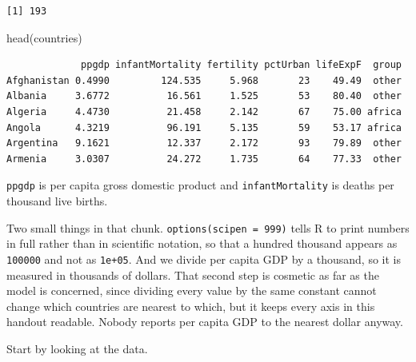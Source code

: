 \documentclass[
  a4paper,
]{scrbook}
\newenvironment{Shaded}{\begin{snugshade}}{\end{snugshade}}
\newcommand{\AttributeTok}[1]{\textcolor[rgb]{0.40,0.45,0.13}{#1}}
\newcommand{\DecValTok}[1]{\textcolor[rgb]{0.68,0.00,0.00}{#1}}
\newcommand{\FloatTok}[1]{\textcolor[rgb]{0.68,0.00,0.00}{#1}}
\newcommand{\FunctionTok}[1]{\textcolor[rgb]{0.28,0.35,0.67}{#1}}
\newcommand{\NormalTok}[1]{\textcolor[rgb]{0.00,0.23,0.31}{#1}}
\newcommand{\SpecialCharTok}[1]{\textcolor[rgb]{0.37,0.37,0.37}{#1}}
\newcommand{\StringTok}[1]{\textcolor[rgb]{0.13,0.47,0.30}{#1}}
\begin{document}
\begin{verbatim}
[1] 193
\end{verbatim}

\begin{Shaded}
\begin{Highlighting}[]
\FunctionTok{head}\NormalTok{(countries)}
\end{Highlighting}
\end{Shaded}

\begin{verbatim}
             ppgdp infantMortality fertility pctUrban lifeExpF  group
Afghanistan 0.4990         124.535     5.968       23    49.49  other
Albania     3.6772          16.561     1.525       53    80.40  other
Algeria     4.4730          21.458     2.142       67    75.00 africa
Angola      4.3219          96.191     5.135       59    53.17 africa
Argentina   9.1621          12.337     2.172       93    79.89  other
Armenia     3.0307          24.272     1.735       64    77.33  other
\end{verbatim}

\texttt{ppgdp} is per capita gross domestic product and
\texttt{infantMortality} is deaths per thousand live births.

Two small things in that chunk. \texttt{options(scipen\ =\ 999)} tells R
to print numbers in full rather than in scientific notation, so that a
hundred thousand appears as \texttt{100000} and not as \texttt{1e+05}.
And we divide per capita GDP by a thousand, so it is measured in
thousands of dollars. That second step is cosmetic as far as the model
is concerned, since dividing every value by the same constant cannot
change which countries are nearest to which, but it keeps every axis in
this handout readable. Nobody reports per capita GDP to the nearest
dollar anyway.

Start by looking at the data.

\begin{Shaded}
\end{Shaded}
\end{document}
